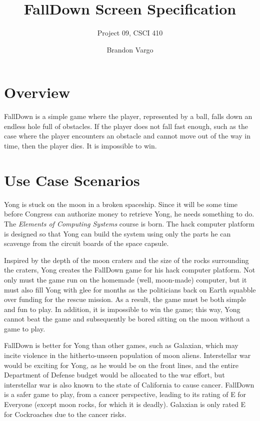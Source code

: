 \documentclass[margin,letterpaper,11pt]{scrartcl}
\begin{document}
\setlength{\pdfpageheight}{\paperheight}
\setlength{\pdfpagewidth}{\paperwidth}

\title{FallDown Screen Specification}
\subtitle{Project 09, CSCI 410}
\date{}
\author{Brandon Vargo}
\maketitle

\section{Overview}

FallDown is a simple game where the player, represented by a ball, falls down
an endless hole full of obstacles. If the player does not fall fast enough,
such as the case where the player encounters an obstacle and cannot move out of
the way in time, then the player dies. It is impossible to win.

\section{Use Case Scenarios}

Yong is stuck on the moon in a broken spaceship. Since it will be some time
before Congress can authorize money to retrieve Yong, he needs something to
do. The \textit{Elements of Computing Systems} course is born. The hack
computer platform is designed so that Yong can build the system using only
the parts he can scavenge from the circuit boards of the space capsule.

Inspired by the depth of the moon craters and the size of the rocks
surrounding the craters, Yong creates the FallDown game for his hack computer
platform. Not only must the game run on the homemade (well, moon-made)
computer, but it must also fill Yong with glee for months as the politicians
back on Earth squabble over funding for the rescue mission. As a result, the
game must be both simple and fun to play. In addition, it is impossible to win
the game; this way, Yong cannot beat the game and subsequently be bored
sitting on the moon without a game to play.

FallDown is better for Yong than other games, such as Galaxian, which
may incite violence in the hitherto-unseen population of moon
aliens.  Interstellar war would be exciting for Yong, as he would be on the
front lines, and the entire Department of Defense budget would be allocated
to the war effort, but interstellar war is also known to the state of
California to cause cancer. FallDown is a safer game to play, from a cancer
perspective, leading to its rating of E for Everyone (except moon rocks, for
which it is deadly). Galaxian is only rated E for Cockroaches due to the
cancer risks.
\end{document}
